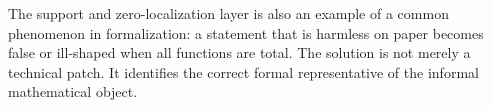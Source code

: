 The support and zero-localization layer is also an example of a common
phenomenon in formalization: a statement that is harmless on paper becomes
false or ill-shaped when all functions are total.  The solution is not merely a
technical patch.  It identifies the correct formal representative of the
informal mathematical object.
